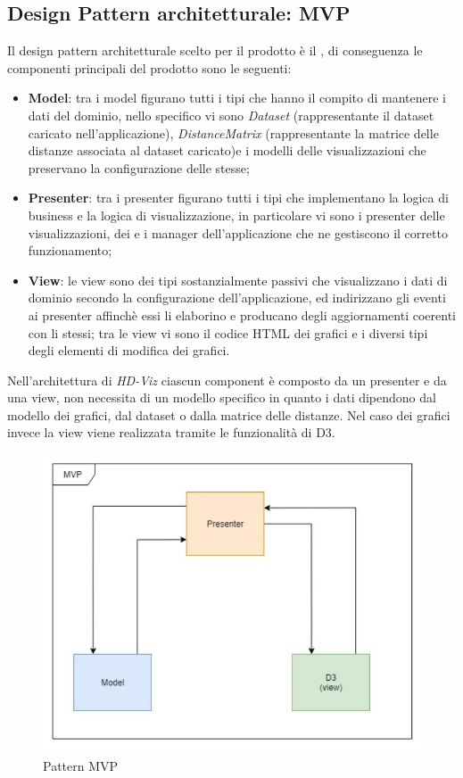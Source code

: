 \documentclass[../manuale_sviluppatore.tex]{subfiles}
\begin{document}
\subsection{Design Pattern architetturale: MVP}
Il design pattern architetturale scelto per il prodotto è il , di 
conseguenza le componenti principali del prodotto sono le seguenti:
\begin{itemize}
	\item \textbf{Model}: tra i model figurano tutti i tipi che hanno il compito di mantenere i dati 
	del dominio, nello specifico vi sono \emph{Dataset} (rappresentante il dataset caricato 
	nell'applicazione), \emph{DistanceMatrix} (rappresentante la matrice delle distanze associata 
	al dataset caricato)e i modelli delle visualizzazioni che preservano la configurazione delle 
	stesse;
	\item \textbf{Presenter}: tra i presenter figurano tutti i tipi che implementano la logica di 
	business e la logica di visualizzazione, in particolare vi sono i presenter delle 
	visualizzazioni, dei  e i manager dell'applicazione che ne gestiscono il 
	corretto funzionamento;
	\item \textbf{View}: le view sono dei tipi sostanzialmente passivi che visualizzano i dati di 
	dominio secondo la configurazione dell'applicazione, ed indirizzano gli eventi ai presenter 
	affinchè essi li elaborino e producano degli aggiornamenti coerenti con li stessi; tra le view 
	vi sono il codice HTML dei grafici e i diversi tipi degli elementi di modifica dei grafici.
\end{itemize}

Nell'architettura di \emph{HD-Viz} ciascun component è composto da un presenter e da una view, 
non necessita di un modello specifico in quanto i dati dipendono dal modello dei grafici, dal 
dataset o dalla matrice delle distanze. Nel caso dei grafici invece la view viene realizzata 
tramite le funzionalità di D3.

\begin{figure}[H]
	\centering
	\includegraphics[width=18cm]{src/img/patternMVP.jpg}
	\caption{Pattern MVP}
\end{figure}
\end{document}
